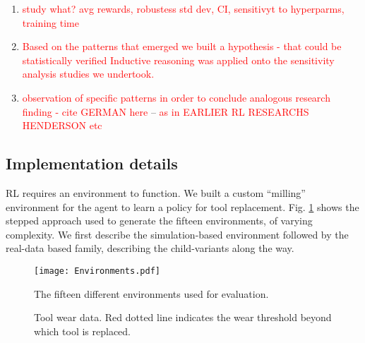 \documentclass[referee, sn-mathphys-num]{sn-jnl}
\begin{document}
	
	
	\begin{enumerate}
		\item \textcolor{red}{study what? avg rewards, robustess std dev, CI, sensitivyt to hyperparms, training time}
		\item \textcolor{red}{Based on the patterns that emerged we built a hypothesis - that could be statistically verified  Inductive reasoning was applied onto the sensitivity analysis studies we undertook.}
		\item \textcolor{red}{observation of specific patterns in order to conclude analogous research finding - cite GERMAN here } --\cite{Germann2023} \textcolor{red}{as in EARLIER RL RESEARCHS HENDERSON etc }
	\end{enumerate}
	
	\subsection{Implementation details}\label{sec_Implementation}
	RL requires an environment to function. We built a custom ``milling'' environment for the agent to learn a policy for tool replacement. Fig. \ref{fig_environments} shows the stepped approach used to generate the fifteen environments, of varying complexity. We first describe the simulation-based environment followed by the real-data based family, describing the child-variants along the way.
	\begin{figure}[hbt!]
		\centering
		\texttt{[image: Environments.pdf]}  
		\caption{The fifteen different environments used for evaluation.}
		\label{fig_environments}
	\end{figure} 
	
	\begin{figure}
		\centering	
		\hfill
		\par\bigskip
		\centering	
		\hfill
		\caption{Tool wear data. Red dotted line indicates the wear threshold beyond which tool is replaced.}
		\label{fig_tool wear-plots}
	\end{figure}
	
\end{document}

